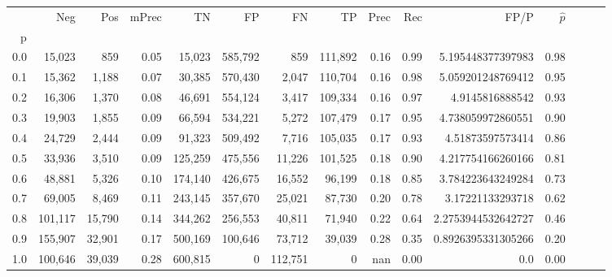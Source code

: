 \begin{tabular}{rrrrrrrrrrrrrrr}
\toprule
{} &      Neg &     Pos & mPrec &       TN &       FP &       FN &       TP &  Prec &   Rec &                FP/P & $\hat{p}$ \\
p   &          &         &       &          &          &          &          &       &       &                     &           \\
\midrule
0.0 &   15,023 &     859 &  0.05 &   15,023 &  585,792 &      859 &  111,892 &  0.16 &  0.99 &   5.195448377397983 &      0.98 \\
0.1 &   15,362 &   1,188 &  0.07 &   30,385 &  570,430 &    2,047 &  110,704 &  0.16 &  0.98 &   5.059201248769412 &      0.95 \\
0.2 &   16,306 &   1,370 &  0.08 &   46,691 &  554,124 &    3,417 &  109,334 &  0.16 &  0.97 &     4.9145816888542 &      0.93 \\
0.3 &   19,903 &   1,855 &  0.09 &   66,594 &  534,221 &    5,272 &  107,479 &  0.17 &  0.95 &   4.738059972860551 &      0.90 \\
0.4 &   24,729 &   2,444 &  0.09 &   91,323 &  509,492 &    7,716 &  105,035 &  0.17 &  0.93 &    4.51873597573414 &      0.86 \\
0.5 &   33,936 &   3,510 &  0.09 &  125,259 &  475,556 &   11,226 &  101,525 &  0.18 &  0.90 &   4.217754166260166 &      0.81 \\
0.6 &   48,881 &   5,326 &  0.10 &  174,140 &  426,675 &   16,552 &   96,199 &  0.18 &  0.85 &   3.784223643249284 &      0.73 \\
0.7 &   69,005 &   8,469 &  0.11 &  243,145 &  357,670 &   25,021 &   87,730 &  0.20 &  0.78 &    3.17221133293718 &      0.62 \\
0.8 &  101,117 &  15,790 &  0.14 &  344,262 &  256,553 &   40,811 &   71,940 &  0.22 &  0.64 &  2.2753944532642727 &      0.46 \\
0.9 &  155,907 &  32,901 &  0.17 &  500,169 &  100,646 &   73,712 &   39,039 &  0.28 &  0.35 &  0.8926395331305266 &      0.20 \\
1.0 &  100,646 &  39,039 &  0.28 &  600,815 &        0 &  112,751 &        0 &   nan &  0.00 &                 0.0 &      0.00 \\
\bottomrule
\end{tabular}
